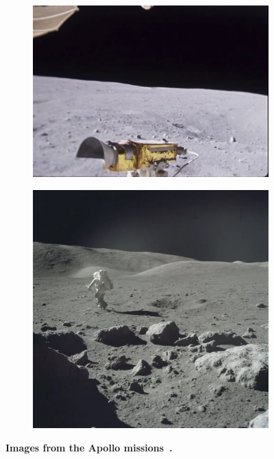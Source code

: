 \begin{figure}[b]
	\centering
	\begin{subfigure}[b]{0.55\linewidth}
		\includegraphics[width=\linewidth,trim=0 0.5 0.5em 0,clip]{figures/rover2.png}
	\end{subfigure}
	\begin{subfigure}[b]{0.395\linewidth}
		\includegraphics[width=\linewidth,trim=0 0.5 0.5em 0,clip]{figures/surface_astronaut.png}
	\end{subfigure}
	\caption{\bfseries Images from the Apollo missions~\cite{nasa_apollo_2017}.}
\end{figure}

